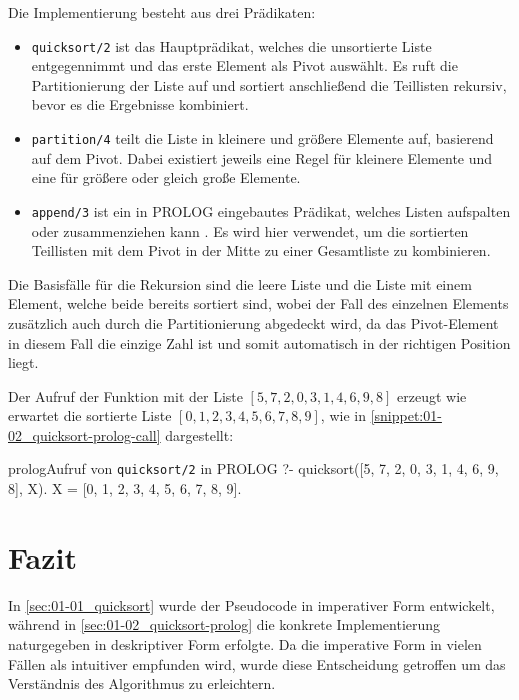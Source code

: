 Die Implementierung besteht aus drei Prädikaten:

\begin{itemize}
    \item \texttt{quicksort/2} ist das Hauptprädikat, welches die unsortierte Liste entgegennimmt und das erste Element als Pivot auswählt. Es ruft die Partitionierung der Liste auf und sortiert anschließend die Teillisten rekursiv, bevor es die Ergebnisse kombiniert.
    \item \texttt{partition/4} teilt die Liste in kleinere und größere Elemente auf, basierend auf dem Pivot. Dabei existiert jeweils eine Regel für kleinere Elemente und eine für größere oder gleich große Elemente.
    \item \texttt{append/3} ist ein in PROLOG eingebautes Prädikat, welches Listen aufspalten oder zusammenziehen kann \cite[S. 69]{003_KII11_basics-of-artificial-intelligence}. Es wird hier verwendet, um die sortierten Teillisten mit dem Pivot in der Mitte zu einer Gesamtliste zu kombinieren.
\end{itemize}

Die Basisfälle für die Rekursion sind die leere Liste und die Liste mit einem Element, welche beide bereits sortiert sind, wobei der Fall des einzelnen Elements zusätzlich auch durch die Partitionierung abgedeckt wird, da das Pivot-Element in diesem Fall die einzige Zahl ist und somit automatisch in der richtigen Position liegt.

Der Aufruf der Funktion mit der Liste $[5, 7, 2, 0, 3, 1, 4, 6, 9, 8]$ erzeugt wie erwartet die sortierte Liste $[0, 1, 2, 3, 4, 5, 6, 7, 8, 9]$, wie in \autoref{snippet:01-02_quicksort-prolog-call} dargestellt:

\begin{snippet}[htb]
    \centering
    \begin{codebox}{prolog}{Aufruf von \texttt{quicksort/2} in PROLOG}
        ?- quicksort([5, 7, 2, 0, 3, 1, 4, 6, 9, 8], X).
        X = [0, 1, 2, 3, 4, 5, 6, 7, 8, 9].
    \end{codebox}
    \caption{Aufruf von \texttt{quicksort/2} in PROLOG}
    \label{snippet:01-02_quicksort-prolog-call}
\end{snippet}

\section{Fazit}
\label{sec:01-03_conclusion}

In \autoref{sec:01-01_quicksort} wurde der Pseudocode in imperativer Form entwickelt, während in \autoref{sec:01-02_quicksort-prolog} die konkrete Implementierung naturgegeben in deskriptiver Form erfolgte. Da die imperative Form in vielen Fällen als intuitiver empfunden wird, wurde diese Entscheidung getroffen um das Verständnis des Algorithmus zu erleichtern.

